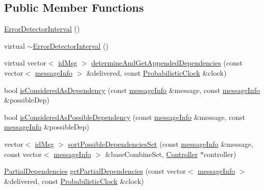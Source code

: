 \subsection*{Public Member Functions}
\begin{DoxyCompactItemize}
\item 
\hyperlink{classErrorDetectorInterval_a31b5edf31d0bfa45dfe4d0e4733d59b2}{Error\+Detector\+Interval} ()
\item 
virtual \hyperlink{classErrorDetectorInterval_a13501d384b2f53dd19dfa1dd9ee0f8fe}{$\sim$\+Error\+Detector\+Interval} ()
\item 
virtual vector$<$ \hyperlink{structures_8h_a83a1d9a070efa5341da84cfd8e28d3e5}{id\+Msg} $>$ \hyperlink{classErrorDetectorInterval_a6cb5dc28ef7349060d15727e92a6780a}{determine\+And\+Get\+Appended\+Dependencies} (const vector$<$ \hyperlink{structures_8h_a7e7bdc1d2fff8a9436f2f352b2711ed6}{message\+Info} $>$ \&delivered, const \hyperlink{classProbabilisticClock}{Probabilistic\+Clock} \&clock)
\item 
bool \hyperlink{classErrorDetectorInterval_a27cb3ca9d7e5c3ddda9ee5ee66f182ed}{is\+Considered\+As\+Dependency} (const \hyperlink{structures_8h_a7e7bdc1d2fff8a9436f2f352b2711ed6}{message\+Info} \&message, const \hyperlink{structures_8h_a7e7bdc1d2fff8a9436f2f352b2711ed6}{message\+Info} \&possible\+Dep)
\item 
bool \hyperlink{classErrorDetectorInterval_a33bf470042fb65d833fd0f091374a046}{is\+Considered\+As\+Possible\+Dependency} (const \hyperlink{structures_8h_a7e7bdc1d2fff8a9436f2f352b2711ed6}{message\+Info} \&message, const \hyperlink{structures_8h_a7e7bdc1d2fff8a9436f2f352b2711ed6}{message\+Info} \&possible\+Dep)
\item 
vector$<$ \hyperlink{structures_8h_a83a1d9a070efa5341da84cfd8e28d3e5}{id\+Msg} $>$ \hyperlink{classErrorDetectorInterval_abe98fbb4f13aeb919d2c2e8755f003ae}{sort\+Possible\+Dependencies\+Set} (const \hyperlink{structures_8h_a7e7bdc1d2fff8a9436f2f352b2711ed6}{message\+Info} \&message, const vector$<$ \hyperlink{structures_8h_a7e7bdc1d2fff8a9436f2f352b2711ed6}{message\+Info} $>$ \&base\+Combine\+Set, \hyperlink{classController}{Controller} $\ast$controller)
\item 
\hyperlink{classPartialDependencies}{Partial\+Dependencies} \hyperlink{classErrorDetectorInterval_a9494a918f551eb1efcab39ffd68316d6}{get\+Partial\+Dependencies} (const vector$<$ \hyperlink{structures_8h_a7e7bdc1d2fff8a9436f2f352b2711ed6}{message\+Info} $>$ \&delivered, const \hyperlink{classProbabilisticClock}{Probabilistic\+Clock} \&clock)
\end{DoxyCompactItemize}
